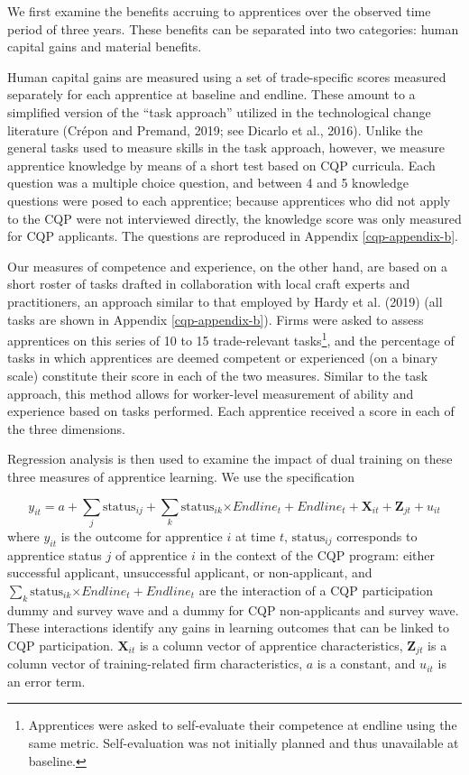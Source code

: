\documentclass[
  11pt,
a4paper
]{report}
\begin{document}
We first examine the benefits accruing to apprentices over the observed time period of three years. These benefits can be separated into two categories: human capital gains and material benefits.

Human capital gains are measured using a set of trade-specific scores measured separately for each apprentice at baseline and endline. These amount to a simplified version of the ``task approach'' utilized in the technological change literature (Crépon and Premand, 2019; see Dicarlo et al., 2016). Unlike the general tasks used to measure skills in the task approach, however, we measure apprentice knowledge by means of a short test based on CQP curricula. Each question was a multiple choice question, and between 4 and 5 knowledge questions were posed to each apprentice; because apprentices who did not apply to the CQP were not interviewed directly, the knowledge score was only measured for CQP applicants. The questions are reproduced in Appendix \ref{cqp-appendix-b}.

Our measures of competence and experience, on the other hand, are based on a short roster of tasks drafted in collaboration with local craft experts and practitioners, an approach similar to that employed by Hardy et al. (2019) (all tasks are shown in Appendix \ref{cqp-appendix-b}). Firms were asked to assess apprentices on this series of 10 to 15 trade-relevant tasks\footnote{Apprentices were asked to self-evaluate their competence at endline using the same metric. Self-evaluation was not initially planned and thus unavailable at baseline.}, and the percentage of tasks in which apprentices are deemed competent or experienced (on a binary scale) constitute their score in each of the two measures. Similar to the task approach, this method allows for worker-level measurement of ability and experience based on tasks performed. Each apprentice received a score in each of the three dimensions.

Regression analysis is then used to examine the impact of dual training on these three measures of apprentice learning. We use the specification

\[ y_{it} = a+\sum_{j}\text{status}_{ij}+\sum_{k}\text{status}_{ik}\text{×}Endline_t+{Endline}_t+\mathbf{X}_{it}+\mathbf{Z}_{jt}+u_{it} \]
where \(y_{it}\) is the outcome for apprentice \(i\) at time \(t\), \(\text{status}_{ij}\) corresponds to apprentice status \(j\) of apprentice \(i\) in the context of the CQP program: either successful applicant, unsuccessful applicant, or non-applicant, and \(\sum_{k}\text{status}_{ik}\text{×}Endline_t+{Endline}_t\) are the interaction of a CQP participation dummy and survey wave and a dummy for CQP non-applicants and survey wave. These interactions identify any gains in learning outcomes that can be linked to CQP participation. \(\mathbf{X}_{it}\) is a column vector of apprentice characteristics, \(\mathbf{Z}_{jt}\) is a column vector of training-related firm characteristics, \(a\) is a constant, and \(u_{it}\) is an error term.
\end{document}
